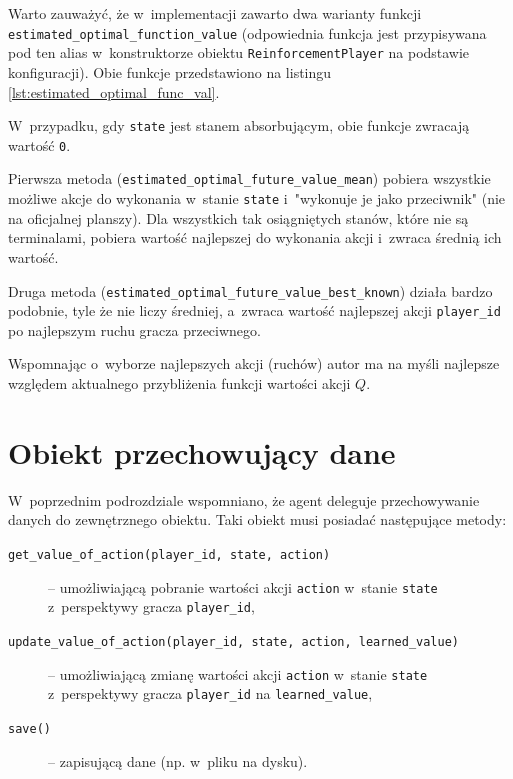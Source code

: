 \documentclass[a4paper, 12pt, oneside]{report}
\begin{document}
\begin{sloppypar}

Warto zauważyć, że w~implementacji zawarto dwa warianty funkcji \texttt{estimated\_optimal\_function\_value} (odpowiednia funkcja jest przypisywana pod ten alias w~konstruktorze obiektu \texttt{ReinforcementPlayer} na podstawie konfiguracji). Obie funkcje przedstawiono na listingu \ref{lst:estimated_optimal_func_val}.

\end{sloppypar}

\needspace{5em}



 W~przypadku, gdy \texttt{state} jest stanem absorbującym, obie funkcje zwracają wartość \texttt{0}.

Pierwsza metoda (\texttt{estimated\_optimal\_future\_value\_mean}) pobiera wszystkie możliwe akcje do wykonania w~stanie \texttt{state} i~"wykonuje je jako przeciwnik" (nie na oficjalnej planszy). Dla wszystkich tak osiągniętych stanów, które nie są terminalami, pobiera wartość najlepszej do wykonania akcji i~zwraca średnią ich wartość.

Druga metoda (\texttt{estimated\_optimal\_future\_value\_best\_known}) działa bardzo podobnie, tyle że nie liczy średniej, a~zwraca wartość najlepszej akcji \texttt{player\_id} po najlepszym ruchu gracza przeciwnego.

Wspomnając o~wyborze najlepszych akcji (ruchów) autor ma na myśli najlepsze względem aktualnego przybliżenia funkcji wartości akcji $Q$.  

\section{Obiekt przechowujący dane}
\label{sec:obiekt_przechowujacy}

 W~poprzednim podrozdziale wspomniano, że agent deleguje przechowywanie danych do zewnętrznego obiektu. Taki obiekt musi posiadać następujące metody:

\begin{description}
\item[\texttt{get\_value\_of\_action(player\_id, state, action)}] -- umożliwiającą pobranie wartości akcji \texttt{action} w~stanie \texttt{state} z~perspektywy gracza \texttt{player\_id},
\item[\texttt{update\_value\_of\_action(player\_id, state, action, learned\_value)}] -- umożliwiającą zmianę wartości akcji \texttt{action} w~stanie \texttt{state} z~perspektywy gracza \texttt{player\_id} na \texttt{learned\_value},
\item[\texttt{save()}] -- zapisującą dane (np. w~pliku na dysku).
\end{description}
\end{document}
